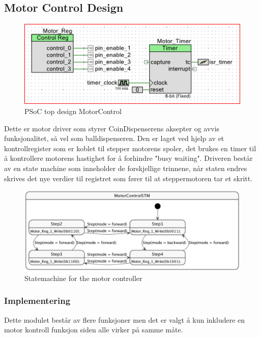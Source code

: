 \documentclass[Softwaredesign/Softwaredesign_main.tex]{subfiles}
\begin{document}
\subsection{Motor Control Design}\label{subsec:motorControlDesign}
    \begin{figure}[H]
    \centering
    \includegraphics[width=\textwidth]{Softwaredesign/CoinSensor/graphics/TopDesign-MotorControl.png}
    \caption{PSoC top design MotorControl}
    \label{fig:MotorControl_PSoC_Design}
    \end{figure}
    Dette er motor driver som styrer CoinDispenserens aksepter og avvis funksjonalitet, så vel som balldispenseren. Den er laget ved hjelp av et kontrollregister som er koblet til stepper motorens spoler, det brukes en timer til å kontrollere motorens hastighet for å forhindre "busy waiting". Driveren består av en state machine som inneholder de forskjellige trinnene, når staten endres skrives det nye verdier til registret som fører til at steppermotoren tar et skritt.
    
    \begin{figure}
        \centering
        \includegraphics[width=\textwidth]{Softwaredesign/CoinSensor/graphics/MotorControlSTM.png}
        \caption{Statemachine for the motor controller}
        \label{fig:MotorControlSTM}
    \end{figure}
    
    \subsubsection{Implementering}
Dette modulet består av flere funksjoner men det er valgt å kun inkludere en motor kontroll funksjon siden alle virker på samme måte.
\end{document}
